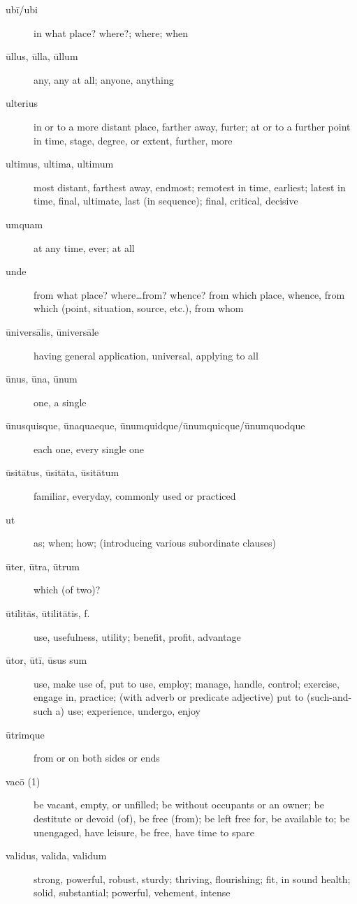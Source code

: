 \begin{description}
    \item[ubī/ubi] \marginnote{*}in what place? where?; where; when
    \item[ūllus, ūlla, ūllum] \marginnote{*}any, any at all; anyone, anything
    \item[ulterius] in or to a more distant place, farther away, furter; at or to a further point in time, stage, degree, or extent, further, more
    \item[ultimus, ultima, ultimum] \marginnote{*}most distant, farthest away, endmost; remotest in time, earliest; latest in time, final, ultimate, last (in sequence); final, critical, decisive
    \item[umquam] \marginnote{*}at any time, ever; at all
    \item[unde] \marginnote{*}from what place? where\dots from? whence? from which place, whence, from which (point, situation, source, etc.), from whom
    \item[ūniversālis, ūniversāle] having general application, universal, applying to all
    \item[ūnus, ūna, ūnum] \marginnote{*}one, a single
    \item[ūnusquisque, ūnaquaeque, ūnumquidque/ūnumquicque/ūnumquodque] each one, every single one
    \item[ūsitātus, ūsitāta, ūsitātum] familiar, everyday, commonly used or practiced
    \item[ut] \marginnote{*}as; when; how; (introducing various subordinate clauses)
    \item[ūter, ūtra, ūtrum] which (of two)?
    \item[ūtilitās, ūtilitātis, f.] use, usefulness, utility; benefit, profit, advantage
    \item[ūtor, ūtī, ūsus sum] \marginnote{*}use, make use of, put to use, employ; manage, handle, control; exercise, engage in, practice; (with adverb or predicate adjective) put to (such-and-such a) use; experience, undergo, enjoy
    \item[ūtrimque] from or on both sides or ends
    \item[vacō (1)] be vacant, empty, or unfilled; be without occupants or an owner; be destitute or devoid (of), be free (from); be left free for, be available to; be unengaged, have leisure, be free, have time to spare
    \item[validus, valida, validum] \marginnote{*}strong, powerful, robust, sturdy; thriving, flourishing; fit, in sound health; solid, substantial; powerful, vehement, intense

\end{description}
